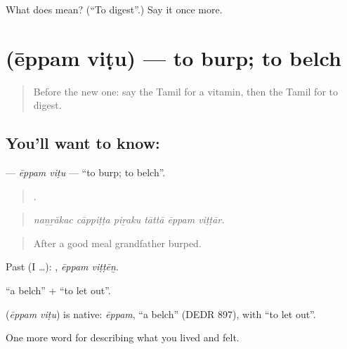 \begin{tcolorbox}[breakable,colback=teal!4,colframe=teal!35!black,title={Before you move on}]
What does  mean? (\textquotedblleft{}To digest\textquotedblright{}.) Say it once more.
\end{tcolorbox}
\section[\texorpdfstring{\ta{ஏப்பம்} \ta{விடு} (ēppam viṭu)}{ஏப்பம் விடு (ēppam viṭu)}]{  (ēppam viṭu) — to burp; to belch}

\label{lesson:TA-C487-eppam-vitu}



\begin{quote}
Before the new one: say the Tamil for a vitamin, then the Tamil for to digest.
\end{quote}

\subsection*{You'll want to know:  }
\textbf{ } — \emph{ēppam viṭu} — \textquotedblleft{}to burp; to belch\textquotedblright{}.

\begin{quote}
     .
\end{quote}

\begin{quote}
\emph{naṉṟākac cāppiṭṭa piṟaku tāttā ēppam viṭṭār.}
\end{quote}

\begin{quote}
After a good meal grandfather burped.
\end{quote}

Past (I …):  , \emph{ēppam viṭṭēṉ}.

 \textquotedblleft{}a belch\textquotedblright{} +  \textquotedblleft{}to let out\textquotedblright{}.

\begin{cousinweb}
\textbf{ } (\emph{ēppam viṭu}) is native:  \emph{ēppam}, \textquotedblleft{}a belch\textquotedblright{} (DEDR 897), with  \textquotedblleft{}to let out\textquotedblright{}.
\end{cousinweb}

\begin{grammarlens}[title={What you've built}]
One more word for describing what you lived and felt.
\end{grammarlens}

